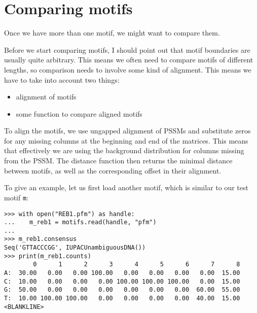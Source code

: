\section{Comparing motifs}
\label{sec:comp}
Once we have more than one motif, we might want to compare them.

Before we start comparing motifs, I should point out that motif
boundaries are usually quite arbitrary. This means we often need
to compare motifs of different lengths, so comparison needs to involve
some kind of alignment.  This means we have to take into account two things:
\begin{itemize}
\item alignment of motifs
\item some function to compare aligned motifs
\end{itemize}
To align the motifs, we use ungapped alignment of PSSMs and substitute zeros
for any missing columns at the beginning and end of the matrices. This means
that effectively we are using the background distribution for columns missing
from the PSSM.
The distance function then returns the minimal distance between motifs, as
well as the corresponding offset in their alignment.

To give an example, let us first load another motif,
which is similar to our test motif \verb|m|:
\begin{verbatim}
>>> with open("REB1.pfm") as handle:
...    m_reb1 = motifs.read(handle, "pfm")
...
>>> m_reb1.consensus
Seq('GTTACCCGG', IUPACUnambiguousDNA())
>>> print(m_reb1.counts)
        0      1      2      3      4      5      6      7      8
A:  30.00   0.00   0.00 100.00   0.00   0.00   0.00   0.00  15.00
C:  10.00   0.00   0.00   0.00 100.00 100.00 100.00   0.00  15.00
G:  50.00   0.00   0.00   0.00   0.00   0.00   0.00  60.00  55.00
T:  10.00 100.00 100.00   0.00   0.00   0.00   0.00  40.00  15.00
<BLANKLINE>
\end{verbatim}


